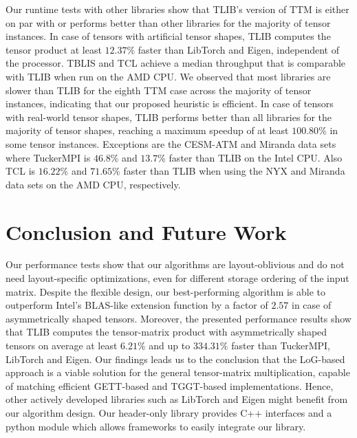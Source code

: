 Our runtime tests with other libraries show that TLIB's  version of TTM is either on par with or performs better than other libraries for the majority of tensor instances.
In case of tensors with artificial tensor shapes, TLIB computes the tensor product at least $12.37$\% faster than LibTorch and Eigen, independent of the processor.
TBLIS and TCL achieve a median throughput that is comparable with TLIB when run on the AMD CPU.
We observed that most libraries are slower than TLIB for the eighth TTM case across the majority of tensor instances, indicating that our proposed heuristic is efficient.
In case of tensors with real-world tensor shapes, TLIB performs better than all libraries for the majority of tensor shapes, reaching a maximum speedup of at least $100.80$\% in some tensor instances.
Exceptions are the CESM-ATM and Miranda data sets where TuckerMPI is $46.8$\% and $13.7$\% faster than TLIB on the Intel CPU.
Also TCL is $16.22$\% and $71.65$\% faster than TLIB when using the NYX and Miranda data sets on the AMD CPU, respectively.


\section{Conclusion and Future Work}
\label{sec:conclusion}
Our performance tests show that our algorithms are layout-oblivious and do not need layout-specific optimizations, even for different storage ordering of the input matrix.
Despite the flexible design, our best-performing algorithm is able to outperform Intel's BLAS-like extension function  by a factor of $2.57$ in case of asymmetrically shaped tensors.
Moreover, the presented performance results show that TLIB computes the tensor-matrix product with asymmetrically shaped tensors on average at least $6.21$\% and up to $334.31$\% faster than TuckerMPI, LibTorch and Eigen.
Our findings leads us to the conclusion that the LoG-based approach is a viable solution for the general tensor-matrix multiplication, capable of matching efficient GETT-based and TGGT-based implementations.
Hence, other actively developed libraries such as LibTorch and Eigen might benefit from our algorithm design.
Our header-only library provides C++ interfaces and a python module which allows frameworks to easily integrate our library.

